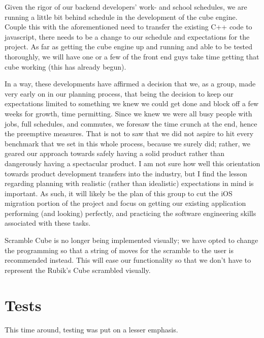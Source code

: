 \documentclass[12pt]{article}
\begin{document}
\par Given the rigor of our backend developers’ work- and school schedules, we are running a little bit behind schedule in the development of the cube engine. Couple this with the aforementioned need to transfer the existing C++ code to javascript, there needs to be a change to our schedule and expectations for the project. As far as getting the cube engine up and running and able to be tested thoroughly, we will have one or a few of the front end guys take time getting that cube working (this has already begun). \\

\par In a way, these developments have affirmed a decision that we, as a group, made very early on in our planning process, that being the decision to keep our expectations limited to something we knew we could get done and block off a few weeks for growth, time permitting. Since we knew we were all busy people with jobs, full schedules, and commutes, we foresaw the time crunch at the end, hence the preemptive measures. That is not to saw that we did not aspire to hit every benchmark that we set in this whole process, because we surely did; rather, we geared our approach towards safely having a solid product rather than dangerously having a  spectacular product. I am not sure how well this orientation towards product development transfers into the industry, but I find the lesson regarding planning with realistic (rather than idealistic) expectations in mind is important. As such, it will likely be the plan of this group to cut the iOS migration portion of the project and focus on getting our existing application performing (and looking) perfectly, and practicing the software engineering skills associated with these tasks. \\

\par Scramble Cube is no longer being implemented visually; we have opted to change the programming so that a string of moves for the scramble to the user is recommended instead. This will ease our functionality so that we don’t have to represent the Rubik’s Cube scrambled visually. \\

\section{Tests}

\par This time around, testing was put on a lesser emphasis. \\
\end{document}
